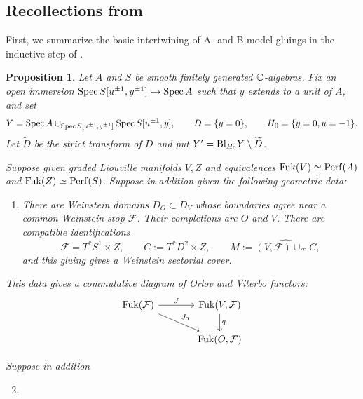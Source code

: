 \documentclass[12pt, letter]{amsart}
\newtheorem{proposition}[theorem]{Proposition}
\theoremstyle{definition}
\numberwithin{equation}{section}
\begin{document}
\subsection{Recollections from \cite{HS}}

First, we summarize the basic intertwining of A- and B-model gluings in the inductive step of \cite{HS}.

\begin{proposition}\label{prop:mirror-gluing}
Let $A$ and $S$ be smooth finitely generated $\mathbb C$-algebras.
Fix an open immersion
$\operatorname{Spec} S[u^{\pm1},y^{\pm1}]\hookrightarrow\operatorname{Spec} A$
such that $y$ extends to a unit of $A$, and set
\[
 Y=\operatorname{Spec} A\cup_{\operatorname{Spec} S[u^{\pm1},y^{\pm1}]}
                      \operatorname{Spec} S[u^{\pm1},y],\qquad
 D=\{y=0\},\qquad H_0=\{y=0,u=-1\}.
\]
Let $\widetilde D$ be the strict transform of $D$ and put
$Y'=\mathrm{Bl}_{H_0}Y\setminus\widetilde D$.

Suppose given graded Liouville manifolds $V, Z$ and equivalences
$\operatorname{Fuk}(V)\simeq\mathrm{Perf}(A)$ and $\operatorname{Fuk}(Z)\simeq\mathrm{Perf}(S)$.  Suppose in addition given the following geometric data: 
\begin{enumerate}[label=\textup{(G\arabic*)}]
\item\label{hyp:gluing-geometry}
There are Weinstein domains $D_O\subset D_V$ whose boundaries
agree near a common Weinstein stop $\mathcal F$.
Their completions are $O$ and $V$.
There are compatible identifications
\[
 \mathcal F=T^*S^1\times Z,\qquad
 C:=T^*D^2\times Z,\qquad
 M:=\widehat{(V,\mathcal F)\cup_{\mathcal F}C},
\]
and this gluing gives a Weinstein sectorial cover.
\end{enumerate}
This data gives a commutative diagram of Orlov and Viterbo functors: 
\[
 \begin{tikzcd}[column sep=large]
 \Fuk(\mathcal F) \arrow[r, "J"] \arrow[rd, "J_0"]
    &\Fuk(V, \mathcal F )\arrow[d,"q"]\\
 & \Fuk(O, \mathcal{F})
 \end{tikzcd}
\]

Suppose in addition
\begin{enumerate}[label=\textup{(G\arabic*)}] 
\setcounter{enumi}{1}
\item\label{hyp:gluing-marking}


\end{enumerate}
\end{proposition}
\end{document}
